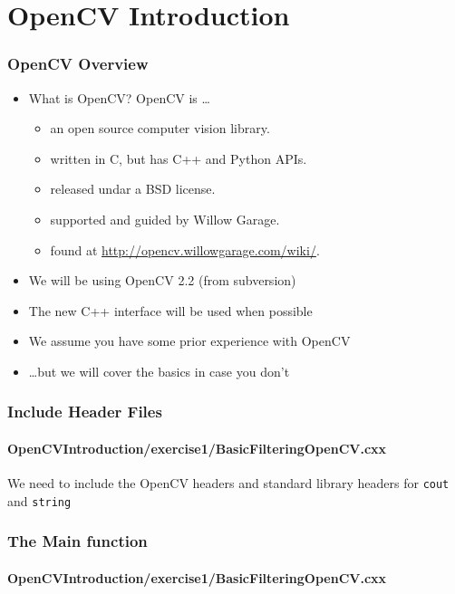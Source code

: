\section{OpenCV Introduction}




\begin{frame}
\frametitle{OpenCV Overview}
\begin{center}
\begin{itemize}
\item What is OpenCV?  OpenCV is \ldots
  \begin{itemize}
  \item an open source computer vision library.
  \item written in C, but has C++ and Python APIs.
  \item released undar a BSD license.
  \item supported and guided by Willow Garage.
  \item found at \url{http://opencv.willowgarage.com/wiki/}.
  \end{itemize}
\pause
\item We will be using OpenCV 2.2 (from subversion)
\item The new C++ interface will be used when possible
\item We assume you have some prior experience with OpenCV
\item \ldots but we will cover the basics in case you don't
\end{itemize}
\end{center}
\end{frame}


\begin{frame}
\frametitle{Include Header Files}
\framesubtitle{OpenCVIntroduction/exercise1/BasicFilteringOpenCV.cxx}
\begin{center}
We need to include the OpenCV headers
\pause
\vspace{1 em}
and standard library headers for {\tt cout} and {\tt string}
\end{center}
\end{frame}


\begin{frame}
\frametitle{The Main function}
\framesubtitle{OpenCVIntroduction/exercise1/BasicFilteringOpenCV.cxx}
\begin{center}
\begin{itemize}
\end{itemize}
\end{center}
\end{frame}



